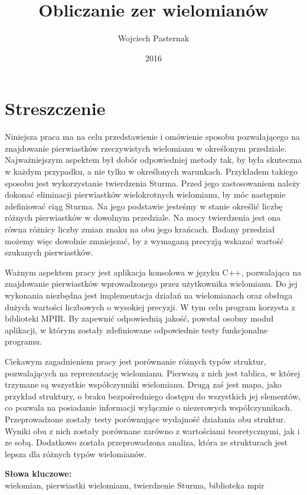 \documentclass[oneside,a4paper]{book}
\title{Obliczanie zer wielomianów}
\author{Wojciech Pasternak}
\date{2016}
\begin{document}
	
	
	
	\mainmatter
	\setcounter{page}{3}
	
	\chapter*{Streszczenie}
	\indent
	Niniejsza praca ma na celu przedstawienie i omówienie sposobu pozwalającego na znajdowanie pierwiastków rzeczywistych wielomianu w określonym przedziale. Najważniejszym aspektem był dobór odpowiedniej metody tak, by była skuteczna w każdym przypadku, a nie tylko w określonych warunkach. Przykładem takiego sposobu jest wykorzystanie twierdzenia Sturma. Przed jego zastosowaniem należy dokonać eliminacji pierwiastków wielokrotnych wielomianu, by móc następnie zdefiniować ciąg Sturma. Na jego podstawie jesteśmy w stanie określić liczbę różnych pierwiastków w dowolnym przedziale.  Na mocy twierdzenia jest ona równa różnicy liczby zmian znaku na obu jego krańcach. Badany przedział możemy więc dowolnie zmniejszać, by z wymaganą precyzją wskazać wartość szukanych pierwiastków.
	
	Ważnym aspektem pracy jest aplikacja konsolowa w języku C++, pozwalająca na znajdowanie pierwiastków wprowadzonego przez użytkownika wielomianu. Do jej wykonania niezbędna jest implementacja działań na wielomianach oraz obsługa dużych wartości liczbowych o wysokiej precyzji. W tym celu program korzysta z biblioteki MPIR. By zapewnić odpowiednią jakość, powstał osobny moduł aplikacji, w którym zostały zdefiniowane odpowiednie testy funkcjonalne programu.
	
	Ciekawym zagadnieniem pracy jest porównanie różnych typów struktur, pozwalających na reprezentację wielomianu. Pierwszą z nich jest tablica, w której trzymane są wszystkie współczynniki wielomianu. Drugą zaś jest mapa, jako przykład struktury, o braku bezpośredniego dostępu do wszystkich jej elementów, co pozwala na posiadanie informacji wyłącznie o niezerowych współczynnikach. Przeprowadzone zostały testy porównujące wydajność działania obu struktur. Wyniki obu z nich zostały porównane zarówno z wartościami teoretycznymi, jak i ze sobą. Dodatkowo została przeprowadzona analiza, która ze strukturach jest lepsza dla różnych typów wielomianów.
	
	\vspace{12pt}
	\noindent\textbf{Słowa kluczowe:}\\ wielomian, pierwiastki wielomianu, twierdzenie Sturma, biblioteka mpir
	
\end{document}
